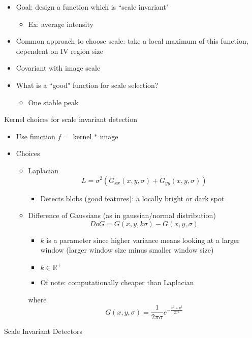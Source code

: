 \begin{itemize}
    \item Goal: design a function which is ``scale invariant"
    \begin{itemize}
        \item Ex: average intensity
    \end{itemize}
    \item Common approach to choose scale: take a local maximum of this function, dependent on IV region size
    \item Covariant with image scale
    \item What is a ``good" function for scale selection?
    \begin{itemize}
        \item One stable peak
    \end{itemize}
\end{itemize}
Kernel choices for scale invariant detection
\begin{itemize}
    \item Use function $f=$ kernel $ * $ image
    \item Choices
    \begin{itemize}
        \item Laplacian
        \[L=\sigma^2\left(G_{xx}(x,y,\sigma) + G_{yy}(x,y,\sigma)\right)\]
        \begin{itemize}
            \item Detects blobs (good features): a locally bright or dark spot
        \end{itemize}
        \item Difference of Gaussians (as in gaussian/normal distribution)
        \[DoG=G(x,y,k\sigma)-G(x,y,\sigma)\]
        \begin{itemize}
            \item $k$ is a parameter since higher variance means looking at a larger window (larger window size minus smaller window size)
            \item $k\in \mathbb R^+$
            \item Of note: computationally cheaper than Laplacian
        \end{itemize}
        where
        \[G(x,y,\sigma)=\frac{1}{2\pi\sigma}e^{-\frac{x^2+y^2}{2\sigma^2}}\]
    \end{itemize}
\end{itemize}
Scale Invariant Detectors
